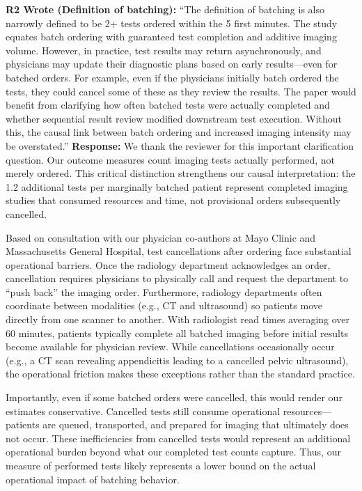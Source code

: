 \documentclass[11pt]{article}
\newenvironment{quote2}
{ \bigskip
\noindent
         \small\em
         \baselineskip=14pt
}
\newcommand{\1}{\hbox{\rm 1\kern-.35em 1}}
\begin{document}
\begin{quote2}
\textbf{R2 Wrote (Definition of batching):}  
``The definition of batching is also narrowly defined to be 2+ tests ordered within the 5 first minutes. The study equates batch ordering with guaranteed test completion and additive imaging volume. However, in practice, test results may return asynchronously, and physicians may update their diagnostic plans based on early results—even for batched orders. For example, even if the physicians initially batch ordered the tests, they could cancel some of these as they review the results. The paper would benefit from clarifying how often batched tests were actually completed and whether sequential result review modified downstream test execution. Without this, the causal link between batch ordering and increased imaging intensity may be overstated.'' 
\end{quote2}

\noindent\textbf{Response:} \color{blue}
We thank the reviewer for this important clarification question. Our outcome measures count imaging tests actually performed, not merely ordered. This critical distinction strengthens our causal interpretation: the 1.2 additional tests per marginally batched patient represent completed imaging studies that consumed resources and time, not provisional orders subsequently cancelled.

Based on consultation with our physician co-authors at Mayo Clinic and Massachusetts General Hospital, test cancellations after ordering face substantial operational barriers. Once the radiology department acknowledges an order, cancellation requires physicians to physically call and request the department to ``push back'' the imaging order. Furthermore, radiology departments often coordinate between modalities (e.g., CT and ultrasound) so patients move directly from one scanner to another. With radiologist read times averaging over 60 minutes, patients typically complete all batched imaging before initial results become available for physician review. While cancellations occasionally occur (e.g., a CT scan revealing appendicitis leading to a cancelled pelvic ultrasound), the operational friction makes these exceptions rather than the standard practice.

Importantly, even if some batched orders were cancelled, this would render our estimates conservative. Cancelled tests still consume operational resources---patients are queued, transported, and prepared for imaging that ultimately does not occur. These inefficiencies from cancelled tests would represent an additional operational burden beyond what our completed test counts capture. Thus, our measure of performed tests likely represents a lower bound on the actual operational impact of batching behavior.
\end{document}
